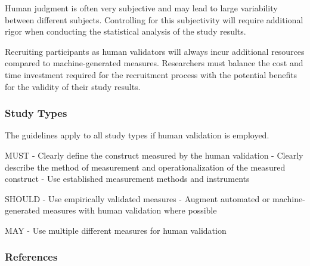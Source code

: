 \documentclass[11pt]{article}
\begin{document}
Human judgment is often very subjective and may lead to large variability between different subjects.
Controlling for this subjectivity will require additional rigor when conducting the statistical analysis of the study results.

Recruiting participants as human validators will always incur additional resources compared to machine-generated measures.
Researchers must balance the cost and time investment required for the recruitment process with the potential benefits for the validity of their study results.

\subsubsection{Study Types}

The guidelines apply to all study types if human validation is employed.

MUST
- Clearly define the construct measured by the human validation
- Clearly describe the method of measurement and operationalization of the measured construct
- Use established measurement methods and instruments

SHOULD
- Use empirically validated measures
- Augment automated or machine-generated measures with human validation where possible

MAY
- Use multiple different measures for human validation


\subsubsection{References}



\end{document}

